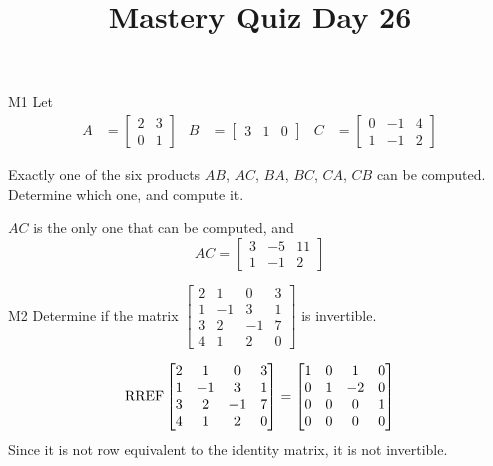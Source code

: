 \documentclass{sbgLAquiz}
\title{Mastery Quiz Day 26 }
\begin{document}
\begin{problem}{M1}
Let 
\begin{align*}
A &= \begin{bmatrix} 2 & 3 \\ 0 & 1 \end{bmatrix} & B&= \begin{bmatrix} 3 & 1 & 0 \end{bmatrix} & C&= \begin{bmatrix} 0 & -1 & 4 \\ 1 & -1 & 2 \end{bmatrix}
\end{align*}

Exactly one of the six products $AB$, $AC$, $BA$, $BC$, $CA$, $CB$ can be computed.  Determine which one, and compute it.
\end{problem}
\begin{solution}
$AC$ is the only one that can be computed, and 
$$AC = \begin{bmatrix} 3 & -5 & 11 \\ 1 & -1 & 2 \end{bmatrix}$$
\end{solution}

\begin{problem}{M2}
Determine if the matrix $\begin{bmatrix} 2 & 1 & 0 & 3 \\ 1 & -1 & 3 & 1 \\ 3 & 2 & -1 & 7 \\ 4 & 1 & 2 & 0 \end{bmatrix}$ is invertible.
\end{problem}
\begin{solution}
$$\operatorname{RREF} \begin{bmatrix} 2 & 1 & 0 & 3 \\ 1 & -1 & 3 & 1 \\ 3 & 2 & -1 & 7 \\ 4 & 1 & 2 & 0 \end{bmatrix}=\begin{bmatrix} 1 & 0 & 1 & 0 \\ 0 & 1 & -2 & 0 \\ 0 & 0 & 0 & 1 \\ 0 & 0 & 0 & 0 \end{bmatrix}$$
Since it is not row equivalent to the identity matrix, it is not invertible.
\end{solution}
\end{document}
